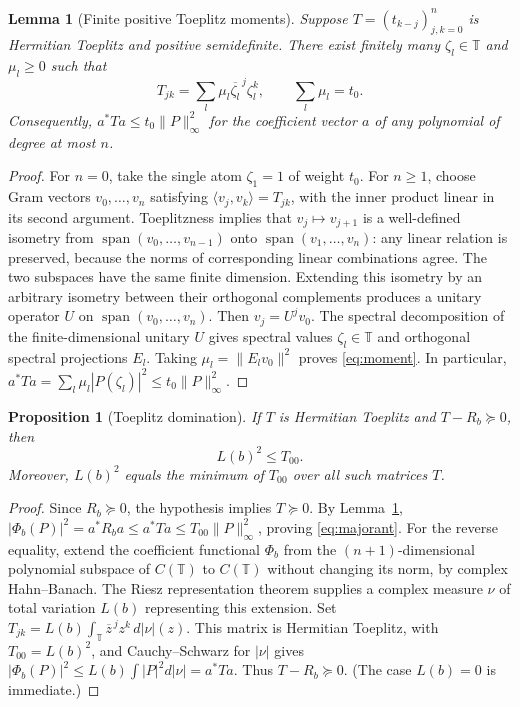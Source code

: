 \documentclass[11pt]{article}
\newtheorem{lemma}[theorem]{Lemma}
\newtheorem{proposition}[theorem]{Proposition}
\newcommand{\T}{\mathbb T}
\begin{document}
\begin{lemma}[Finite positive Toeplitz moments]\label{lem:moment}
Suppose $T=(t_{k-j})_{j,k=0}^n$ is Hermitian Toeplitz and positive semidefinite. There exist finitely many $\zeta_l\in\T$ and $\mu_l\ge0$ such that
\begin{equation}\label{eq:moment}
 T_{jk}=\sum_l\mu_l\overline{\zeta_l}^{\,j}\zeta_l^k,
 \qquad\sum_l\mu_l=t_0.
\end{equation}
Consequently, $a^*Ta\le t_0\|P\|_\infty^2$ for the coefficient vector $a$ of any polynomial of degree at most $n$.
\end{lemma}
\begin{proof}
For $n=0$, take the single atom $\zeta_1=1$ of weight $t_0$.
For $n\ge1$, choose Gram vectors $v_0,\ldots,v_n$ satisfying $\langle v_j,v_k\rangle=T_{jk}$, with the inner product linear in its second argument. Toeplitzness implies that $v_j\mapsto v_{j+1}$ is a well-defined isometry from $\operatorname{span}(v_0,\ldots,v_{n-1})$ onto $\operatorname{span}(v_1,\ldots,v_n)$: any linear relation is preserved, because the norms of corresponding linear combinations agree. The two subspaces have the same finite dimension. Extending this isometry by an arbitrary isometry between their orthogonal complements produces a unitary operator $U$ on $\operatorname{span}(v_0,\ldots,v_n)$. Then $v_j=U^jv_0$. The spectral decomposition of the finite-dimensional unitary $U$ gives spectral values $\zeta_l\in\T$ and orthogonal spectral projections $E_l$. Taking $\mu_l=\|E_lv_0\|^2$ proves \eqref{eq:moment}. In particular,
$a^*Ta=\sum_l\mu_l|P(\zeta_l)|^2\le t_0\|P\|_\infty^2$.
\end{proof}

\begin{proposition}[Toeplitz domination]\label{prop:majorant}
If $T$ is Hermitian Toeplitz and $T-R_b\succeq0$, then
\begin{equation}\label{eq:majorant}
 L(b)^2\le T_{00}.
\end{equation}
Moreover, $L(b)^2$ equals the minimum of $T_{00}$ over all such matrices $T$.
\end{proposition}
\begin{proof}
Since $R_b\succeq0$, the hypothesis implies $T\succeq0$. By Lemma~\ref{lem:moment},
$|\Phi_b(P)|^2=a^*R_ba\le a^*Ta\le T_{00}\|P\|_\infty^2$, proving \eqref{eq:majorant}.
For the reverse equality, extend the coefficient functional $\Phi_b$ from the $(n+1)$-dimensional polynomial subspace of $C(\T)$ to $C(\T)$ without changing its norm, by complex Hahn--Banach. The Riesz representation theorem supplies a complex measure $\nu$ of total variation $L(b)$ representing this extension. Set
$T_{jk}=L(b)\int_{\T}\overline z^{\,j}z^k\,d|\nu|(z)$. This matrix is Hermitian Toeplitz, with $T_{00}=L(b)^2$, and Cauchy--Schwarz for $|\nu|$ gives
$|\Phi_b(P)|^2\le L(b)\int|P|^2d|\nu|=a^*Ta$. Thus $T-R_b\succeq0$. (The case $L(b)=0$ is immediate.)
\end{proof}
\end{document}
